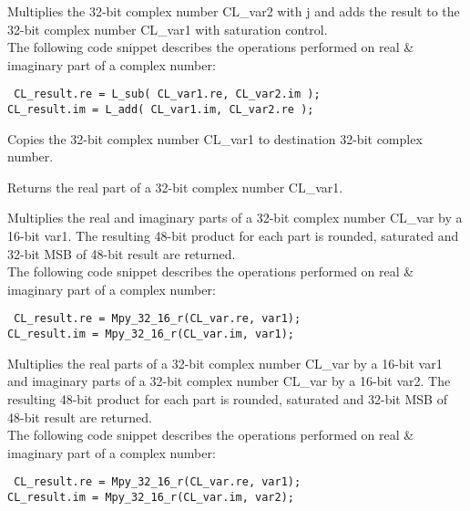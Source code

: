 Multiplies the 32-bit complex number CL\_var2 with j and adds the result to the 32-bit complex number CL\_var1 with saturation control.\\
The following code snippet describes the operations performed on real \& imaginary part of a complex number:

{\tt {} CL\_result.re = L\_sub( CL\_var1.re, CL\_var2.im );\\
 CL\_result.im = L\_add( CL\_var1.im, CL\_var2.re );
}


Copies the 32-bit complex number CL\_var1 to destination 32-bit complex number.


Returns the real part of a 32-bit complex number CL\_var1.


Multiplies the real and imaginary parts of a 32-bit complex number CL\_var by a 16-bit var1.
The resulting 48-bit product for each part is rounded, saturated and 32-bit MSB of 48-bit result are returned.\\
The following code snippet describes the operations performed on real \& imaginary part of a complex number:

{\tt {} CL\_result.re = Mpy\_32\_16\_r(CL\_var.re, var1);\\
 CL\_result.im = Mpy\_32\_16\_r(CL\_var.im, var1);
}


Multiplies the real parts of a 32-bit complex number CL\_var by a 16-bit var1 and imaginary parts of a 32-bit complex number CL\_var by a 16-bit var2.
The resulting 48-bit product for each part is rounded, saturated and 32-bit MSB of 48-bit result are returned.\\
The following code snippet describes the operations performed on real \& imaginary part of a complex number:

{\tt {} CL\_result.re = Mpy\_32\_16\_r(CL\_var.re, var1);\\
 CL\_result.im = Mpy\_32\_16\_r(CL\_var.im, var2);
}

